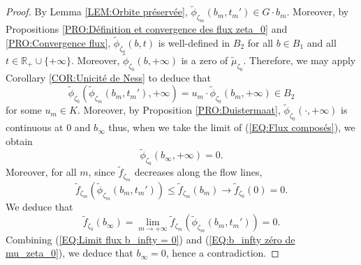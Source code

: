 \documentclass{article}
\theoremstyle{remark}
\theoremstyle{definition}
\newcommand{\R}{\mathbb{R}}
\renewcommand{\leq}{\leqslant}
\begin{document}
\begin{proof}
By Lemma \ref{LEM:Orbite préservée}, $\tilde{\phi}_{\zeta_m}(b_m,t_m') \in G \cdot b_m$. Moreover, by Propositions \ref{PRO:Définition et convergence des flux zeta_0} and \ref{PRO:Convergence flux}, $\tilde{\phi}_{\zeta_0}(b,t)$ is well-defined in $B_2$ for all $b \in B_1$ and all $t \in \R_+ \cup \{+\infty\}$. Moreover, $\tilde{\phi}_{\zeta_0}(b,+\infty)$ is a zero of $\tilde{\mu}_{\zeta_0}$. Therefore, we may apply Corollary \ref{COR:Unicité de Ness} to deduce that
\begin{equation}\label{EQ:Flux composés}
\tilde{\phi}_{\zeta_0}(\tilde{\phi}_{\zeta_m}(b_m,t_m'),+\infty) = u_m \cdot \tilde{\phi}_{\zeta_0}(b_m,+\infty) \in B_2
\end{equation}
for some $u_m \in K$. Moreover, by Proposition \ref{PRO:Duistermaat}, $\tilde{\phi}_{\zeta_0}(\cdot,+\infty)$ is continuous at $0$ and $b_\infty$ thus, when we take the limit of (\ref{EQ:Flux composés}), we obtain
\begin{equation}\label{EQ:Limit flux b_infty = 0}
\tilde{\phi}_{\zeta_0}(b_\infty,+\infty) = 0.
\end{equation}
Moreover, for all $m$, since $\tilde{f}_{\zeta_m}$ decreases along the flow lines,
$$
\tilde{f}_{\zeta_m}(\tilde{\phi}_{\zeta_m}(b_m,t_m')) \leq \tilde{f}_{\zeta_m}(b_m) \rightarrow \tilde{f}_{\zeta_0}(0) = 0.
$$
We deduce that
\begin{equation}\label{EQ:b_infty zéro de mu_zeta_0}
    \tilde{f}_{\zeta_0}(b_\infty) = \lim_{m \rightarrow +\infty} \tilde{f}_{\zeta_m}(\tilde{\phi}_{\zeta_m}(b_m,t_m')) = 0.
\end{equation}
Combining (\ref{EQ:Limit flux b_infty = 0}) and (\ref{EQ:b_infty zéro de mu_zeta_0}), we deduce that $b_\infty = 0$, hence a contradiction.
\end{proof}
\end{document}

